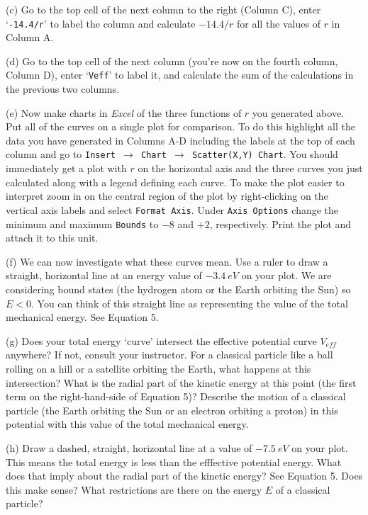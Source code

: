 (c) Go to the top cell of the next column to the right (Column C), enter `{\tt -14.4/r}' to label
the column and calculate $-14.4/r$ for all the values of $r$ in Column A.

(d) Go to the top cell of the next column (you're now on the fourth column, Column D),
enter `{\tt Veff}' to label it, and calculate
the sum of the calculations in the previous two columns.

(e) Now make charts in {\it Excel} of the three functions of $r$ you generated above.
Put all of the curves on a single plot for comparison.
To do this highlight all the data you have generated in Columns A-D 
including the labels at the top
of each column and go to 
{\tt Insert $\rightarrow$ Chart $\rightarrow$ Scatter(X,Y) Chart}.
You should immediately get a plot with $r$ on the horizontal axis and the three
curves you just calculated along with a legend defining each curve.
To make the plot easier to interpret zoom in on 
the central region of the plot by right-clicking on the vertical axis labels 
and select {\tt Format Axis}. Under {\tt Axis Options} change the minimum and 
maximum {\tt Bounds} to $-8$ and $+2$, respectively. Print the plot and attach it to this unit.

(f) We can now investigate what these curves mean. Use a ruler to draw a
straight, horizontal line at an energy value of $-3.4~eV$ on your plot.
We are considering bound states (the hydrogen atom or the Earth orbiting the Sun) 
so $E < 0$.
You can think of this straight line as representing the value of the total 
mechanical energy. See Equation 5.

(g) Does your total energy `curve' intersect the effective potential curve $V_{eff}$ anywhere?
If not, consult your instructor.
For a classical particle like a ball rolling on a hill or a satellite orbiting the
Earth, what happens at this intersection?
What is the radial part of the kinetic energy  at this point
(the first term on the right-hand-side of Equation 5)?
Describe the motion of a classical particle (the Earth orbiting the Sun or an
electron orbiting a proton) in this potential with this value of the total mechanical
energy.

\answerspace{3.0cm}

(h) Draw a dashed, straight, horizontal line at a value of $-7.5~ eV$ on your plot. This means the
total energy is less than the efffective potential energy.
What does that imply about the radial part of the kinetic energy?
See Equation 5.
Does this make sense?
What restrictions are there on the energy $E$ of a classical particle?

